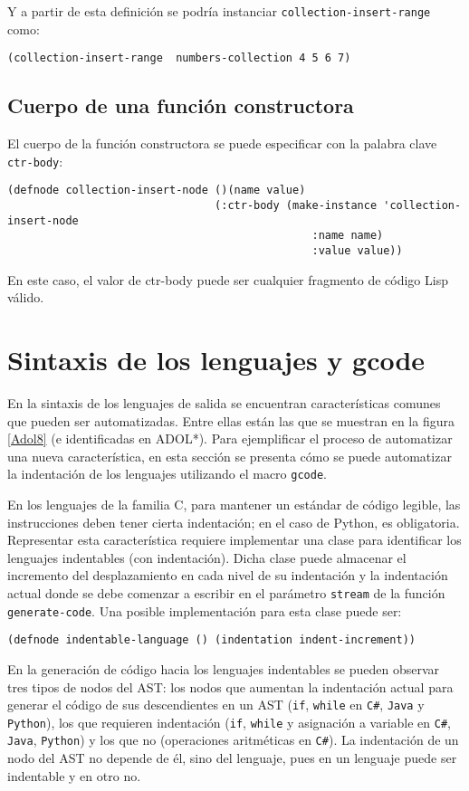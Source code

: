 Y a partir de esta definición se podría instanciar \texttt{collection-insert-range} como: 

\begin{verbatim}
(collection-insert-range  numbers-collection 4 5 6 7)
\end{verbatim}

\subsection{Cuerpo de una función constructora}

El cuerpo de la función constructora se puede especificar con la palabra clave \texttt{ctr-body}:
\begin{verbatim}
(defnode collection-insert-node ()(name value)
								(:ctr-body (make-instance 'collection-insert-node
								               :name name)
								               :value value))
\end{verbatim}
En este caso, el valor de ctr-body puede ser cualquier fragmento de código Lisp válido.
\section{Sintaxis de los lenguajes y gcode}
\label{lenguajesygcode}
En la sintaxis de los lenguajes de salida se encuentran características comunes que pueden ser automatizadas. Entre ellas están las que se muestran en la figura \ref{Adol8} (e identificadas en ADOL*). Para ejemplificar el proceso de automatizar una nueva característica, en esta sección se presenta cómo se puede automatizar la indentación de los lenguajes utilizando el macro \texttt{gcode}. 

En los lenguajes de la familia C, para mantener un estándar de código legible, las instrucciones deben tener cierta indentación; en el caso de Python, es obligatoria. Representar esta característica requiere implementar una clase para identificar los lenguajes indentables (con indentación). Dicha clase puede almacenar el incremento del desplazamiento en cada nivel de su indentación y la indentación actual donde se debe comenzar a escribir en el parámetro \texttt{stream} de la función \texttt{generate-code}. Una posible implementación para esta clase puede ser:

\begin{verbatim}
(defnode indentable-language () (indentation indent-increment))
\end{verbatim}


En la generación de código hacia los lenguajes indentables se pueden observar tres tipos de nodos del AST: los nodos que aumentan la indentación actual para generar el código de sus descendientes en un AST (\texttt{if}, \texttt{while} en \texttt{C\#}, \texttt{Java} y \texttt{Python}), los que requieren indentación (\texttt{if}, \texttt{while} y asignación a variable en \texttt{C\#}, \texttt{Java}, \texttt{Python}) y los que no (operaciones aritméticas en \texttt{C\#}). La indentación de un nodo del AST no depende de él, sino del lenguaje, pues en un lenguaje puede ser indentable y en otro no. 

